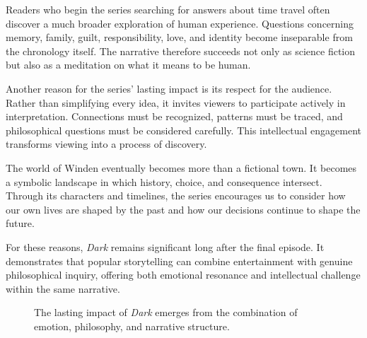 \documentclass[12pt,oneside,openany]{book}
\begin{document}
Readers who begin the series searching for answers about time travel often
discover a much broader exploration of human experience. Questions concerning
memory, family, guilt, responsibility, love, and identity become inseparable
from the chronology itself. The narrative therefore succeeds not only as
science fiction but also as a meditation on what it means to be human.

Another reason for the series' lasting impact is its respect for the audience.
Rather than simplifying every idea, it invites viewers to participate actively
in interpretation. Connections must be recognized, patterns must be traced,
and philosophical questions must be considered carefully. This intellectual
engagement transforms viewing into a process of discovery.

The world of Winden eventually becomes more than a fictional town. It becomes
a symbolic landscape in which history, choice, and consequence intersect.
Through its characters and timelines, the series encourages us to consider how
our own lives are shaped by the past and how our decisions continue to shape
the future.

For these reasons, \textit{Dark} remains significant long after the final
episode. It demonstrates that popular storytelling can combine entertainment
with genuine philosophical inquiry, offering both emotional resonance and
intellectual challenge within the same narrative.

\begin{figure}[H]
\centering
{}

\caption{The lasting impact of \textit{Dark} emerges from the combination of emotion, philosophy, and narrative structure.}
\end{figure}
\end{document}
